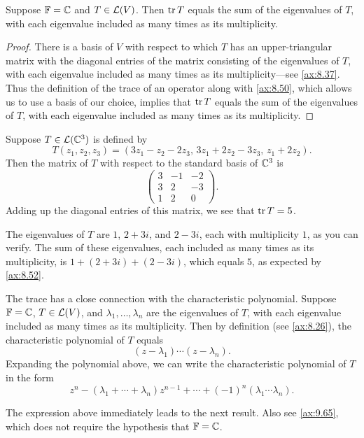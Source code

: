 \begin{result}\label{ax:8.52}
Suppose $\mathbb{F}=\mathbb{C}$ and $T\in\mathcal{L}(V)$. Then $\operatorname{tr} T$ equals the sum of the
eigenvalues of $T$, with each eigenvalue included as many times as its
multiplicity.
\end{result}

\begin{proof}
There is a basis of $V$ with respect to which $T$ has an upper-triangular matrix
with the diagonal entries of the matrix consisting of the eigenvalues of $T$,
with each eigenvalue included as many times as its multiplicity---see
\ref{ax:8.37}. Thus the definition of the trace of an operator along with
\ref{ax:8.50}, which allows us to use a basis of our choice, implies that
$\operatorname{tr} T$ equals the sum of the eigenvalues of $T$, with each eigenvalue included
as many times as its multiplicity.
\end{proof}

\begin{example}\label{ax:8.53}
Suppose $T\in\mathcal{L}(\mathbb{C}^3)$ is defined by
\[ T(z_1,z_2,z_3) = (3z_1-z_2-2z_3,\,3z_1+2z_2-3z_3,\,z_1+2z_2). \]
Then the matrix of $T$ with respect to the standard basis of $\mathbb{C}^3$ is
\[ \begin{pmatrix}
3 & -1 & -2\\
3 & 2 & -3\\
1 & 2 & 0
\end{pmatrix}. \]
Adding up the diagonal entries of this matrix, we see that $\operatorname{tr} T=5$.

The eigenvalues of $T$ are $1$, $2+3i$, and $2-3i$, each with multiplicity
$1$, as you can verify. The sum of these eigenvalues, each included as many
times as its multiplicity, is $1+(2+3i)+(2-3i)$, which equals $5$, as expected
by \ref{ax:8.52}.
\end{example}

The trace has a close connection with the characteristic polynomial. Suppose
$\mathbb{F}=\mathbb{C}$, $T\in\mathcal{L}(V)$, and $\lambda_1,\dots,\lambda_n$ are the eigenvalues of
$T$, with each eigenvalue included as many times as its multiplicity. Then by
definition (see \ref{ax:8.26}), the characteristic polynomial of $T$ equals
\[ (z-\lambda_1)\cdots(z-\lambda_n). \]
Expanding the polynomial above, we can write the characteristic polynomial of
$T$ in the form
\[ z^n - (\lambda_1+\cdots+\lambda_n)z^{n-1} + \cdots
   + (-1)^n(\lambda_1\cdots\lambda_n). \]

The expression above immediately leads to the next result. Also see
\ref{ax:9.65}, which does not require the hypothesis that $\mathbb{F}=\mathbb{C}$.

